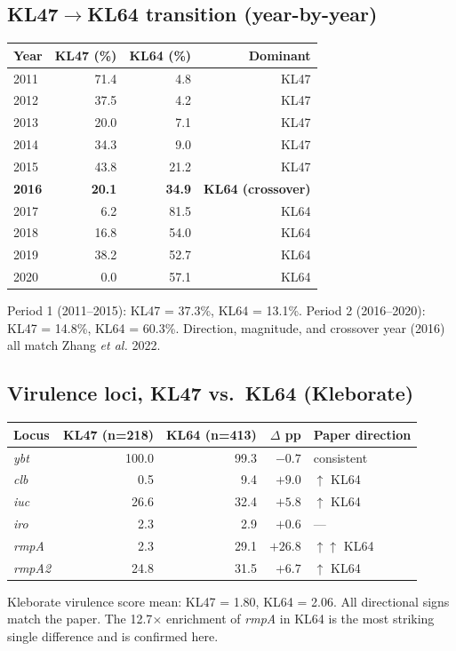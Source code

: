 \documentclass[11pt]{article}
\begin{document}
\subsection{KL47$\rightarrow$KL64 transition (year-by-year)}
\begin{tabular}{@{}lrrr@{}}
\toprule
Year & KL47 (\%) & KL64 (\%) & Dominant \\
\midrule
2011 & 71.4 &  4.8 & KL47 \\
2012 & 37.5 &  4.2 & KL47 \\
2013 & 20.0 &  7.1 & KL47 \\
2014 & 34.3 &  9.0 & KL47 \\
2015 & 43.8 & 21.2 & KL47 \\
\textbf{2016} & \textbf{20.1} & \textbf{34.9} & \textbf{KL64 (crossover)} \\
2017 &  6.2 & 81.5 & KL64 \\
2018 & 16.8 & 54.0 & KL64 \\
2019 & 38.2 & 52.7 & KL64 \\
2020 &  0.0 & 57.1 & KL64 \\
\bottomrule
\end{tabular}

Period 1 (2011--2015): KL47 = 37.3\%, KL64 = 13.1\%. Period 2 (2016--2020):
KL47 = 14.8\%, KL64 = 60.3\%. Direction, magnitude, and crossover year (2016) all match
Zhang \emph{et al.} 2022.

\subsection{Virulence loci, KL47 vs.\ KL64 (Kleborate)}
\begin{tabular}{@{}lrrrl@{}}
\toprule
Locus & KL47 (n=218) & KL64 (n=413) & $\Delta$ pp & Paper direction \\
\midrule
\emph{ybt}   & 100.0 &  99.3 &  $-0.7$ & consistent  \\
\emph{clb}   &   0.5 &   9.4 &  $+9.0$ & $\uparrow$ KL64 \\
\emph{iuc}   &  26.6 &  32.4 &  $+5.8$ & $\uparrow$ KL64 \\
\emph{iro}   &   2.3 &   2.9 &  $+0.6$ & --- \\
\emph{rmpA}  &   2.3 &  29.1 & $+26.8$ & $\uparrow\uparrow$ KL64 \\
\emph{rmpA2} &  24.8 &  31.5 &  $+6.7$ & $\uparrow$ KL64 \\
\bottomrule
\end{tabular}

Kleborate virulence score mean: KL47 = 1.80, KL64 = 2.06. All directional signs match the
paper. The 12.7$\times$ enrichment of \emph{rmpA} in KL64 is the most striking single
difference and is confirmed here.
\end{document}
